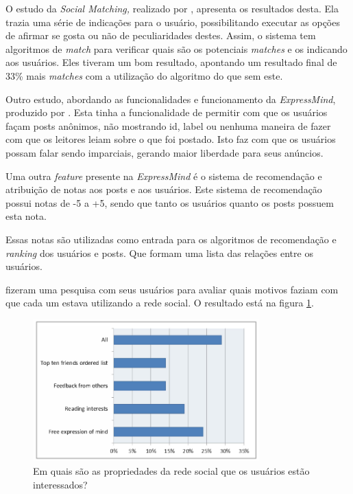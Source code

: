 O estudo da \textit{Social Matching,} realizado por \cite{expressmind},
apresenta os resultados desta. Ela trazia uma série de indicações para o usuário,
possibilitando executar as opções de afirmar se gosta ou não de peculiaridades
destes. Assim, o sistema tem algoritmos de \textit{match} para verificar quais são
os potenciais \textit{matches} e os indicando aos usuários. Eles tiveram um bom resultado,
apontando um resultado final de 33\% mais \textit{matches} com a utilização do algoritmo
do que sem este.

Outro estudo, abordando as funcionalidades e funcionamento da \textit{ExpressMind},
produzido por \cite{expressmind}. Esta tinha a funcionalidade
de  permitir com que os usuários façam posts anônimos, não mostrando id, label ou nenhuma
maneira de fazer com que os leitores leiam sobre o que foi postado. Isto faz com que os
usuários possam falar sendo imparciais, gerando maior liberdade para
seus anúncios.

Uma outra \textit{feature} presente na \textit{ExpressMind} é o sistema de recomendação e atribuição
de notas aos posts e aos usuários. Este sistema de recomendação possui notas
de -5 a +5, sendo que tanto os usuários quanto os posts possuem esta nota.

Essas notas são utilizadas como entrada para os algoritmos de recomendação e
\textit{ranking} dos usuários e posts. Que formam uma lista das relações entre
os usuários.

\cite{expressmind} fizeram uma pesquisa com seus usuários
para avaliar quais motivos faziam com que cada um estava utilizando a rede social. 
O resultado está na figura \ref{fig:expressmind}.


\begin{figure}[h]
    \centering
    \includegraphics[width=330px, scale=1]{figuras/expressmind}
    \caption{Em quais são as propriedades da rede social que os usuários estão interessados?}
    \label{fig:expressmind}
\end{figure}

